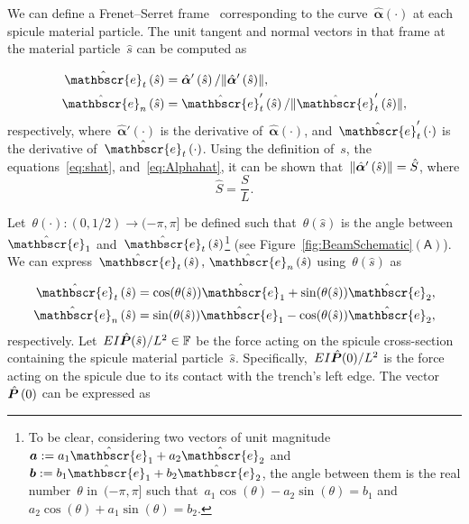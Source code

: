 \documentclass[preprint,10pt,times]{elsarticle}
\numberwithin{equation}{section}
\newcommand{\ndE}{E}
\newcommand{\ndL}{L}
\newcommand{\ndI}{I}
\newcommand{\physe}{\hat{\mathbscr{e}}} %
\renewcommand{\u}[1]{\boldsymbol{#1}}
\newcommand{\chat}[1]{\skew{4}\hat{#1}}
\newcommand{\pr}[1]{\left( #1 \right)}
\newcommand{\norm}[1]{\ensuremath \lVert #1 \rVert}
\newcommand{\subf}[1]{\pr{\textsf{#1}}}
\begin{document}
We can define a Frenet--Serret frame~\cite{forsyth1912lectures}
corresponding to the curve~$\hat{\u{\alpha}}(\cdot)$
at each spicule material particle. The unit tangent and normal vectors
in that frame at the material particle~$\hat{s}$ can be computed
as

\begin{subequations}
\begin{align}
\label{eq:Tvec}
\physe_{t}\pr{\hat{s}}&=\hat{\u{\alpha}}'\pr{\hat{s}}/\norm{\hat{\u{\alpha}}'\pr{\hat{s}}},\\
\label{eq:Nvec}
\physe_{n}\pr{\hat{s}}&=\physe_{t}'\pr{\hat{s}}/\norm{\physe_{t}'\pr{\hat{s}}},
\end{align}
\end{subequations}respectively, where~$\hat{\u{\alpha}}'\pr{\cdot}$ is the derivative
of~$\hat{\u{\alpha}}\pr{\cdot}$, and~$\physe_{t}'\pr{\cdot}$ is
the derivative of~$\physe_{t}\pr{\cdot}$. Using the definition of~$s$,
the equations~\eqref{eq:shat}, and~\eqref{eq:Alphahat}, it can
be shown that~$\norm{\hat{\u{\alpha}}'\pr{\hat{s}}} =\hat{S}${,
where}\begin{equation}\label{eq:Shat}
\hat{S} =\frac{S}{\ndL}  .\end{equation}

Let~$\theta\pr{\cdot}:(0,1/2)\to (-\pi,\pi]$
be defined such that~$\theta\pr{\hat{s}}$ is
the angle between~$\physe_1$ and~$\physe_{t}\pr{\hat{s}}$\footnote{To be clear, considering two vectors of unit magnitude~$\u{a} := a_1\physe_1 + a_2\physe_2$
and~$\u{b}:=b_1\physe_1 + b_2\physe_2$, the angle between them is
the real number~$\theta$ in~$(-\pi,\pi]$ such that~$a_1\cos(\theta)- a_2\sin(\theta) = b_1$
and~$a_2\cos(\theta) + a_1\sin(\theta) = b_2$.} (see Figure~\ref{fig:BeamSchematic}$\subf{A}$). We can express~$\physe_{t}\pr{\hat{s}},\,\physe_{n}\pr{\hat{s}}$
using~$\theta(\hat{s})$ as

\begin{subequations}
\begin{align}
\label{eq:Tangent}
\physe_{t}\pr{\hat{s}}&=\cos(\theta(\hat{s}))\physe_{1}+\sin(\theta(\hat{s}))\physe_{2},\\
\label{eq:Normal}
\physe_{n}\pr{\hat{s}}&=\sin(\theta(\hat{s}))\physe_{1}-\cos(\theta(\hat{s}))\physe_{2},
\end{align}
\end{subequations}respectively. Let~$\ndE\ndI\chat{\u{P}}(\hat{s})/\ndL^2\in\mathbb{F}$
be the force acting on the spicule cross-section containing the spicule
material particle~$\hat{s}$. Specifically,~$\ndE\ndI\chat{\u{P}}(0)/L^2$
is the force acting on the spicule due to its contact with the trench's
left edge. The vector~$\chat{\u{P}}\pr{0}$ can
be expressed as
\end{document}
